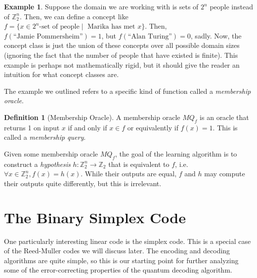 \documentclass[12pt,twoside]{reedthesis}
\theoremstyle{definition}
\newtheorem{definition}[theorem]{Definition}
\newtheorem{example}[theorem]{Example}
\newlength{\arrow}
\newcommand{\Z}{\mathbb{Z}}
\begin{document}
\begin{example}
Suppose the domain we are working with is sets of $2^n$ people instead of $\Z_2^n$. Then, we can define a concept like $f = \{ x\in 2^n \text{-set of people} \mid \text{ Marika has met } x\}$. Then, $f(\text{``Jamie Pommersheim''}) = 1$, but $f(\text{``Alan Turing''}) = 0$, sadly. Now, the concept class is just the union of these concepts over all possible domain sizes (ignoring the fact that the number of people that have existed is finite). This example is perhaps not mathematically rigid, but it should give the reader an intuition for what concept classes are.
\end{example}
The example we outlined refers to a specific kind of function called a \textit{membership oracle}.
\begin{definition}[Membership Oracle] A membership oracle $MQ_f$ is an oracle that returns 1 on input $x$ if and only if $x \in f$ or equivalently if $f(x)=1$. This is called a \textit{membership query}.
\end{definition}

Given some membership oracle $MQ_f$, the goal of the learning algorithm is to construct a \textit{hypothesis} $h: \Z_2^n \rightarrow \Z_2$ that is equivalent to $f$, i.e.~$\forall x \in \Z_2^n, f(x) = h(x)$. While their outputs are equal, $f$ and $h$ may compute their outputs quite differently, but this is irrelevant.

\chapter{The Binary Simplex Code}
One particularly interesting linear code is the simplex code. This is a special case of the Reed-Muller codes we will discuss later. The encoding and decoding algorithms are quite simple, so this is our starting point for further analyzing some of the error-correcting properties of the quantum decoding algorithm.
\end{document}
